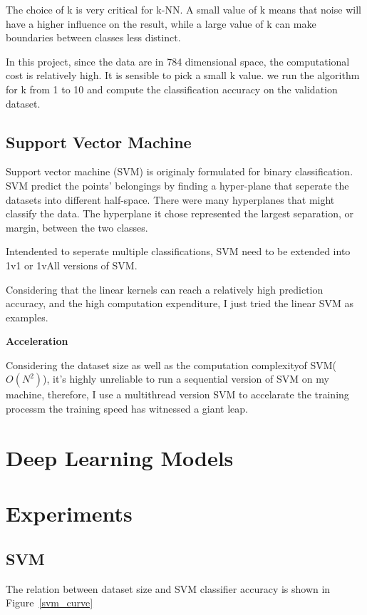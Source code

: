 \documentclass{article}
\begin{document}
The choice of k is very critical for k-NN. A small value of k means that noise will have a higher influence on the result, while a large value of k can make boundaries between classes less distinct.

In this project, since the data are in 784 dimensional space, the computational cost is relatively high. It is sensible to pick a small k value. we run the algorithm for k from 1 to 10 and compute the classification accuracy on the validation dataset.

\subsection{Support Vector Machine}

Support vector machine (SVM) is originaly formulated for binary classification. SVM predict the points' belongings by finding a hyper-plane that seperate the datasets into different half-space. There were many hyperplanes that might classify the data. The hyperplane it chose represented the largest separation, or margin, between the two classes.

Intendented to seperate multiple classifications, SVM need to be extended into 1v1 or 1vAll versions of SVM.

Considering that the linear kernels can reach a relatively high prediction accuracy, and the high computation expenditure, I just tried the linear SVM as examples.

\textbf{Acceleration}

Considering the dataset size as well as the computation complexityof SVM($O(N^2)$), it's highly unreliable to run a sequential version of SVM on my machine, therefore, I use a multithread version SVM to accelarate the training processm the training speed has witnessed a giant leap.


\section{Deep Learning Models }


\section{Experiments}

\subsection{SVM}

The relation between dataset size and SVM classifier accuracy is shown in Figure~\ref{svm_curve}
\end{document}
